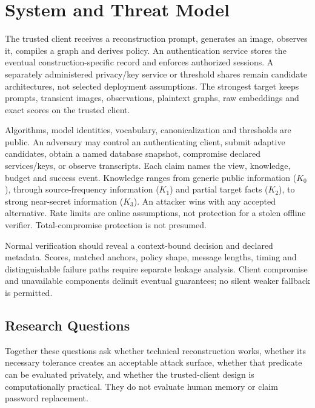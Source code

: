 \documentclass[compsoc,conference,a4paper,10pt,times]{IEEEtran}
\begin{document}
\section{System and Threat Model}
\label{sec:model}
The trusted client receives a reconstruction prompt, generates an image, observes it, compiles a graph and derives policy. An authentication service stores the eventual construction-specific record and enforces authorized sessions. A separately administered privacy/key service or threshold shares remain candidate architectures, not selected deployment assumptions. The strongest target keeps prompts, transient images, observations, plaintext graphs, raw embeddings and exact scores on the trusted client.

Algorithms, model identities, vocabulary, canonicalization and thresholds are public. An adversary may control an authenticating client, submit adaptive candidates, obtain a named database snapshot, compromise declared services/keys, or observe transcripts. Each claim names the view, knowledge, budget and success event. Knowledge ranges from generic public information ($K_0$), through source-frequency information ($K_1$) and partial target facts ($K_2$), to strong near-secret information ($K_3$). An attacker wins with any accepted alternative. Rate limits are online assumptions, not protection for a stolen offline verifier. Total-compromise protection is not presumed.

Normal verification should reveal a context-bound decision and declared metadata. Scores, matched anchors, policy shape, message lengths, timing and distinguishable failure paths require separate leakage analysis. Client compromise and unavailable components delimit eventual guarantees; no silent weaker fallback is permitted.

\subsection{Research Questions}
Together these questions ask whether technical reconstruction works, whether its necessary tolerance creates an acceptable attack surface, whether that predicate can be evaluated privately, and whether the trusted-client design is computationally practical. They do not evaluate human memory or claim password replacement.
\end{document}
